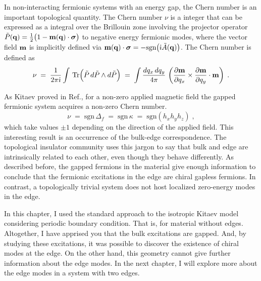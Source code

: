 In non-interacting fermionic systems with an energy gap, the Chern number is an important topological quantity. %
The Chern number $\nu$ is a integer that can be expressed as a integral over the Brillouin zone involving the projector operator $\tilde{P}(\bf{q}) = \frac{1}{2}\big( 1 - \bf{m}(\bf{q})\cdot\bm{\sigma} \big)$ to negative energy fermionic modes, where the vector field $\bf{m}$ is implicitly defined  via $\bf{m}(\bf{q}) \cdot \bm{\sigma} = -\text{sgn}\big( \im \tilde{A}(\bf{q}) \big)$. The Chern number is defined as 
\begin{equation}
    \nu \; = \;  \frac{1}{2 \pi \im } \int \, \text{Tr} \Big( \tilde{P} \, d\tilde{P} \wedge d\tilde{P} \Big) \; = \; \int \frac{dq_x \, dq_y}{4\pi} \, \left( \frac{\partial \bf{m}}{\partial q_x}\times \frac{\partial \bf{m}}{\partial q_y} \cdot \bf{m} \right) \; .
\end{equation}

As Kitaev proved in Ref.\cite{Kitaev_2006}, for a non-zero applied magnetic field the gapped fermionic system acquires a non-zero Chern number.
\begin{equation}
    \nu \; = \; \text{sgn} \, \Delta_{f} \; = \; \text{sgn} \, \kappa \; = \; \text{sgn} \left( h_x h_y h_z \right) \; , 
\end{equation}
which take values $\pm 1$ depending on the direction of the applied field. This interesting result is an occurrence of the bulk-edge correspondence. The topological insulator community uses this jargon to say that bulk and edge are intrinsically related to each other, even though they behave differently. %
As described before, the gapped fermions in the material give enough information to conclude that the fermionic excitations in the edge are chiral gapless fermions. In contrast, a topologically trivial system does not host localized zero-energy modes in the edge.

In this chapter, I used the standard approach to the isotropic Kitaev model considering periodic boundary condition.  That is, for material without edges. Altogether, I have apprised you that the bulk excitations are gapped. And, by studying these excitations, it was possible to discover the existence of chiral modes at the edge.  On the other hand, this geometry cannot give further information about the edge modes. In the next chapter, I will explore more about the edge modes in a system with two edges.


